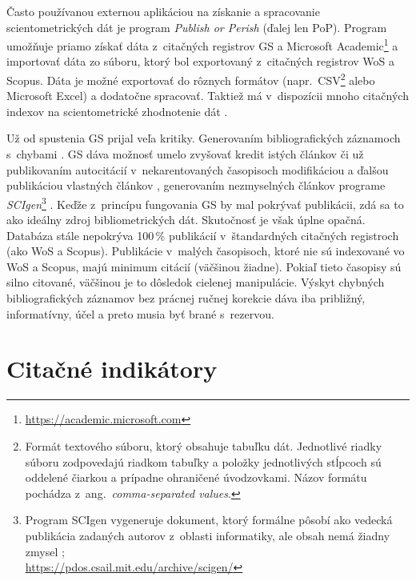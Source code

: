 Často používanou externou aplikáciou na získanie a spracovanie scientometrických
dát je program \emph{Publish or Perish} (ďalej
len PoP).  Program umožňuje priamo získať dáta z~citačných registrov GS a
Microsoft Academic\footnote{\url{https://academic.microsoft.com}} a importovať
dáta zo súboru, ktorý bol exportovaný z~citačných registrov WoS a Scopus.  Dáta
je možné exportovať do rôznych formátov (napr.~CSV\footnote{Formát textového
  súboru, ktorý obsahuje tabuľku dát.  Jednotlivé riadky súboru zodpovedajú
  riadkom tabuľky a položky jednotlivých stĺpcoch sú oddelené čiarkou a prípadne
  ohraničené úvodzovkami.  Názov formátu pochádza z~ang.~\emph{comma-separated
    values}.} alebo Microsoft Excel) a dodatočne spracovať.  Taktiež má
v~dispozícii mnoho citačných indexov na scientometrické zhodnotenie dát
\citep{Harzing2011}.

Už od spustenia GS prijal veľa kritiky.  Generovaním bibliografických záznamoch
s~chybami \citep{Jacso2009,Jacso2010}.  GS dáva možnosť umelo zvyšovať kredit
istých článkov či už publikovaním autocitácií v~nekarentovaných časopisoch
modifikáciou a ďalšou publikáciou vlastných článkov \citep{Beel2010b},
generovaním nezmyselných článkov programe
\emph{SCIgen}\footnote{Program SCIgen vygeneruje dokument,
  ktorý formálne pôsobí ako vedecká publikácia zadaných autorov z~oblasti
  informatiky, ale obsah nemá žiadny zmysel
  \citep{Labbe2013};\\\url{https://pdos.csail.mit.edu/archive/scigen/}}
\citep{Beel2010a}.  Keďže z~princípu fungovania GS by mal pokrývať publikácii,
zdá sa to ako ideálny zdroj bibliometrických dát.  Skutočnosť je však úplne
opačná.  Databáza stále nepokrýva 100\,\% publikácií v~štandardných citačných
registroch (ako WoS a Scopus).  Publikácie v~malých časopisoch, ktoré nie sú
indexované vo WoS a Scopus, majú minimum citácií (väčšinou žiadne).  Pokiaľ
tieto časopisy sú silno citované, väčšinou je to dôsledok cielenej manipulácie.
Výskyt chybných bibliografických záznamov bez prácnej ručnej korekcie dáva iba
približný, informatívny, účel a preto musia byť brané s~rezervou.


\section{Citačné indikátory}
\label{sec:indicators}


